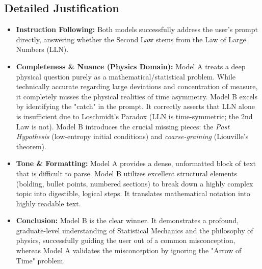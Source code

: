 \documentclass[11pt, a4paper]{article}
\begin{document}
\subsection*{Detailed Justification}
\begin{itemize}
    \item \textbf{Instruction Following:} Both models successfully address the user's prompt directly, answering whether the Second Law stems from the Law of Large Numbers (LLN).
    \item \textbf{Completeness \& Nuance (Physics Domain):} Model A treats a deep physical question purely as a mathematical/statistical problem. While technically accurate regarding large deviations and concentration of measure, it completely misses the physical realities of time asymmetry. Model B excels by identifying the "catch" in the prompt. It correctly asserts that LLN alone is insufficient due to Loschmidt's Paradox (LLN is time-symmetric; the 2nd Law is not). Model B introduces the crucial missing pieces: the \textit{Past Hypothesis} (low-entropy initial conditions) and \textit{coarse-graining} (Liouville's theorem). 
    \item \textbf{Tone \& Formatting:} Model A provides a dense, unformatted block of text that is difficult to parse. Model B utilizes excellent structural elements (bolding, bullet points, numbered sections) to break down a highly complex topic into digestible, logical steps. It translates mathematical notation into highly readable text.
    \item \textbf{Conclusion:} Model B is the clear winner. It demonstrates a profound, graduate-level understanding of Statistical Mechanics and the philosophy of physics, successfully guiding the user out of a common misconception, whereas Model A validates the misconception by ignoring the "Arrow of Time" problem.
\end{itemize}
\end{document}
